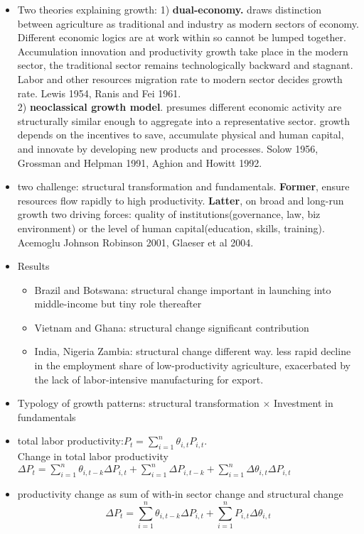 \documentclass[10pt]{article} %
\begin{document}
    \begin{itemize}
        \item Two theories explaining growth: 1) \textbf{dual-economy.} draws distinction between agriculture as traditional and industry as modern sectors of economy. Different economic logics are at work within so cannot be lumped together. Accumulation innovation and productivity growth take place in the modern sector, the traditional sector remains technologically backward and stagnant. Labor and other resources migration rate to modern sector decides growth rate. Lewis 1954, Ranis and Fei 1961.\\
        2) \textbf{neoclassical growth model}. presumes different economic activity are structurally similar enough to aggregate into a representative sector. growth depends on the incentives to save, accumulate physical and human capital, and innovate by developing new products and processes. Solow 1956, Grossman and Helpman 1991, Aghion and Howitt 1992.
        \item two challenge: structural transformation and fundamentals. \textbf{Former}, ensure resources flow rapidly to high productivity. \textbf{Latter}, on broad and long-run growth two driving forces: quality of institutions(governance, law, biz environment) or the level of human capital(education, skills, training). Acemoglu Johnson Robinson 2001, Glaeser et al 2004.
        \item Results
        \begin{itemize}
            \item Brazil and Botswana: structural change important in launching into middle-income but tiny role thereafter
            \item Vietnam and Ghana: structural change significant contribution
            \item India, Nigeria Zambia: structural change different way. less rapid decline in the employment share of low-productivity agriculture, exacerbated by the lack of labor-intensive manufacturing for export.
        \end{itemize}
        \item Typology of growth patterns: structural transformation $\times$ Investment in fundamentals
        \item total labor productivity:\(P_t = \sum\limits_{i=1}^{n}\theta_{i,t}P_{i,t}\). \\ Change in total labor productivity \(\Delta P_t = \sum\limits_{i=1}^{n}\theta_{i,t-k}\Delta P_{i,t} + \sum\limits_{i=1}^{n}\Delta P_{i,t-k} + \sum\limits_{i=1}^{n}\Delta\theta_{i,t}\Delta P_{i,t}\)
        \item productivity change as sum of with-in sector change and structural change \[\Delta P_t = \sum\limits_{i=1}^{n}\theta_{i,t-k}\Delta P_{i,t} + \sum\limits_{i=1}^{n}P_{i,t}\Delta \theta_{i,t}\]
    \end{itemize}
\end{document}
